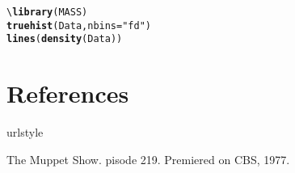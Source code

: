 \documentclass[letterpaper]{article}\usepackage[]{graphicx}\usepackage[]{color}
\makeatletter
\newcommand{\hlstr}[1]{\textcolor[rgb]{0.192,0.494,0.8}{#1}}%
\newcommand{\hlkwd}[1]{\textcolor[rgb]{0.737,0.353,0.396}{\textbf{#1}}}%
\newenvironment{kframe}{%
 \def\at@end@of@kframe{}%
 \ifinner\ifhmode%
  \def\at@end@of@kframe{\end{minipage}}%
  \begin{minipage}{\columnwidth}%
 \fi\fi%
 \def\FrameCommand##1{\hskip\@totalleftmargin \hskip-\fboxsep
 \colorbox{shadecolor}{##1}\hskip-\fboxsep
     \hskip-\linewidth \hskip-\@totalleftmargin \hskip\columnwidth}%
 \MakeFramed {\advance\hsize-\width
   \@totalleftmargin\z@ \linewidth\hsize
   \@setminipage}}%
 {\par\unskip\endMakeFramed%
 \at@end@of@kframe}
\newenvironment{knitrout}{}{} %
\makeatother
\begin{document}
\begin{knitrout}
\color{fgcolor}\begin{kframe}
\begin{alltt}
\textbackslash{}\hlkwd{library}(MASS)
\hlkwd{truehist}(Data, nbins=\hlstr{"fd"})
\hlkwd{lines}(\hlkwd{density}(Data))
\end{alltt}
\end{kframe}
\end{knitrout}

\clearpage
\section{References}\label{Refs}
  

\begin{thebibliography}{1}
\providecommand{\natexlab}[1]{#1}
\providecommand{\url}[1]{\texttt{#1}}
\expandafter\ifx\csname urlstyle\endcsname\relax
  \providecommand{\doi}[1]{doi: #1}\else
  \providecommand{\doi}{doi: \begingroup \urlstyle{rm}\Url}\fi

{The Muppet Show}.
pisode 219.
\newblock Premiered on CBS, 1977.

\end{thebibliography}
\end{document}
